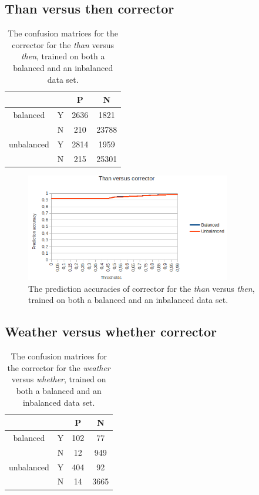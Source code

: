 \documentclass[12pt]{article}
\begin{document}
\subsection{Than versus then corrector}

\begin{table}[H] \footnotesize
\centering
\begin{tabular}{|c|c|c|c|}
\hline
&&P&N\\
\hline
balanced&Y&2636&1821\\
&N&210&23788\\
\hline
\hline
unbalanced&Y&2814&1959\\
&N&215&25301\\
\hline
\end{tabular}
\caption{The confusion matrices for the corrector for the \emph{than} versus \emph{then}, trained on both a balanced and an inbalanced data set.}
\end{table}

\begin{figure}[H]
\centering
\includegraphics[width=0.8\textwidth]{accuracy_thanthen.png}
\caption{The prediction accuracies of corrector for the \emph{than} versus \emph{then}, trained on both a balanced and an inbalanced data set.}
\end{figure}

\subsection{Weather versus whether corrector}

\begin{table}[H] \footnotesize
\centering
\begin{tabular}{|c|c|c|c|}
\hline
&&P&N\\
\hline
balanced&Y&102&77\\
&N&12&949\\
\hline
\hline
unbalanced&Y&404&92\\
&N&14&3665\\
\hline
\end{tabular}
\caption{The confusion matrices for the corrector for the \emph{weather} versus \emph{whether}, trained on both a balanced and an inbalanced data set.}
\end{table}
\end{document}

